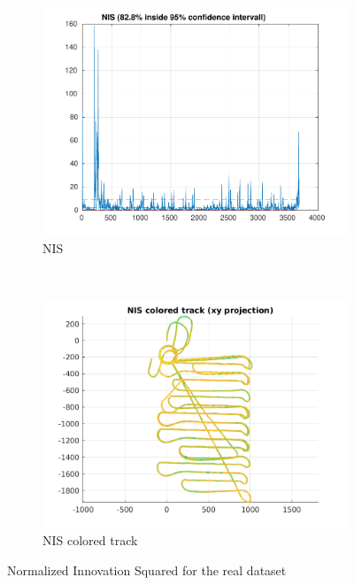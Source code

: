 \begin{figure}[H]
        \centering
        \begin{subfigure}[b]{0.45\textwidth}
                \includegraphics[width=\textwidth]{plots/a2-real-nis}
                \caption{NIS }
                \label{fig:nis_basic}
        \end{subfigure}%
~
        \begin{subfigure}[b]{0.45\textwidth}
                \includegraphics[width=\textwidth]{plots/a2-real-nis-colored-track}
                \caption{NIS colored track}
                \label{fig:nis_colored_track}
        \end{subfigure}
        \caption{Normalized Innovation Squared for the real dataset}
        \label{fig:nis}
\end{figure}

